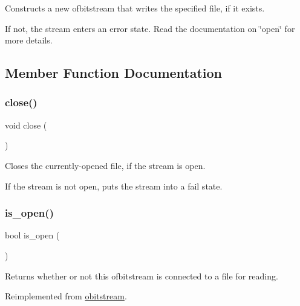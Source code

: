 Constructs a new ofbitstream that writes the specified file, if it exists. 

If not, the stream enters an error state. Read the documentation on \char`\"{}open\char`\"{} for more details. 

\subsection{Member Function Documentation}
\mbox{\label{classofbitstream_a5ae591df94fc66ccb85cbb6565368bca}} 
\subsubsection{\texorpdfstring{close()}{close()}}
{\footnotesize\ttfamily void close (\begin{DoxyParamCaption}{ }\end{DoxyParamCaption})}



Closes the currently-\/opened file, if the stream is open. 

If the stream is not open, puts the stream into a fail state. \mbox{\label{classofbitstream_a2f57f54d8c03b615bb31eee091d8a88a}} 
\subsubsection{\texorpdfstring{is\+\_\+open()}{is\_open()}}
{\footnotesize\ttfamily bool is\+\_\+open (\begin{DoxyParamCaption}{ }\end{DoxyParamCaption})\hspace{0.3cm}{\ttfamily [virtual]}}



Returns whether or not this ofbitstream is connected to a file for reading. 



Reimplemented from \mbox{\hyperlink{classobitstream_a2f57f54d8c03b615bb31eee091d8a88a}{obitstream}}.

\mbox{\label{classofbitstream_a57f80da790b202b27353cd8f8415b382}} 
